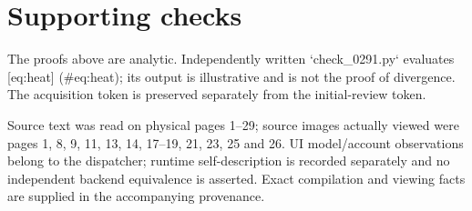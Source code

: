 \documentclass[10pt]{article}
\begin{document}
\section*{Supporting checks}
The proofs above are analytic. Independently written `check\_0291.py` evaluates [eq:heat] (\#eq:heat); its output is illustrative and is not the proof of divergence. The acquisition token is preserved separately from the initial-review token.\par
Source text was read on physical pages 1–29; source images actually viewed were pages 1, 8, 9, 11, 13, 14, 17–19, 21, 23, 25 and 26. UI model/account observations belong to the dispatcher; runtime self-description is recorded separately and no independent backend equivalence is asserted. Exact compilation and viewing facts are supplied in the accompanying provenance.\par
\end{document}
